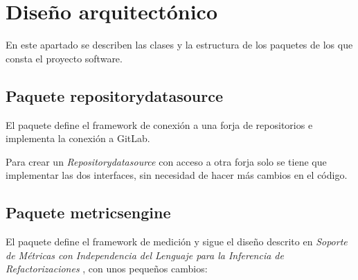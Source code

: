 
\section{Diseño arquitectónico}
En este apartado se describen las clases y la estructura de los paquetes de los que consta el proyecto software.

\subsection{Paquete repositorydatasource}
El paquete define el framework de conexión a una forja de repositorios e implementa la conexión a GitLab.


Para crear un \textit{Repositorydatasource} con acceso a otra forja solo se tiene que implementar las dos interfaces, sin necesidad de hacer más cambios en el código.

\subsection{Paquete metricsengine}
El paquete define el framework de medición y sigue el diseño descrito en \textit{Soporte de Métricas con Independencia del Lenguaje para la Inferencia de Refactorizaciones} \citep{marticorena_sanchez_soporte_2005}, con unos pequeños cambios:

